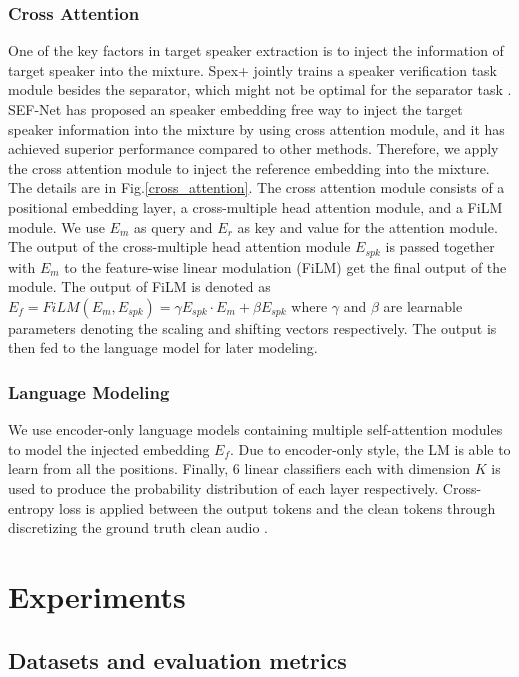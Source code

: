 \documentclass[conference]{IEEEtran}
\begin{document}
\subsubsection{Cross Attention}
One of the key factors in target speaker extraction is to 
inject the information of target speaker 
into the mixture. Spex+ \cite{spex_plus} jointly trains a speaker verification task module 
besides the separator, which might not be optimal for the separator task \cite{sef_net}. SEF-Net \cite{sef_net} has proposed an speaker embedding free way to inject the 
target speaker information into the mixture by using cross attention module, and it has 
achieved superior performance compared to other methods. Therefore, we apply 
the cross attention module to inject the reference embedding into the mixture. The details 
are in Fig.\ref{cross_attention}.
The cross attention module consists of a positional 
embedding layer, a cross-multiple head attention module, 
and a FiLM module. 
We use \(E_m\) as query and \(E_r\) as key and value for 
the attention module. The output of the cross-multiple head attention module \(E_{spk}\)
is passed together with \(E_m\) to the feature-wise linear modulation (FiLM) get the final output of the module. The output of 
FiLM is denoted as \(E_f = FiLM(E_m, E_{spk}) = \gamma E_{spk} \cdot E_m  + \beta E_{spk} \) where 
\(\gamma\) and \(\beta\) are learnable parameters denoting the scaling and shifting vectors 
respectively. The output is then fed to the language model for later modeling.  
\subsubsection{Language Modeling}
We use encoder-only language models containing multiple self-attention modules to model the injected 
embedding \(E_f\). Due to encoder-only style, the LM is able to learn from all the positions. 
Finally, 6 linear classifiers each with dimension \(K\) is used to produce the probability 
distribution of each layer respectively.
Cross-entropy loss is applied between 
the output tokens and the clean tokens through discretizing the 
ground truth clean audio . 

\section{Experiments}

\subsection{Datasets and evaluation metrics}
\end{document}
